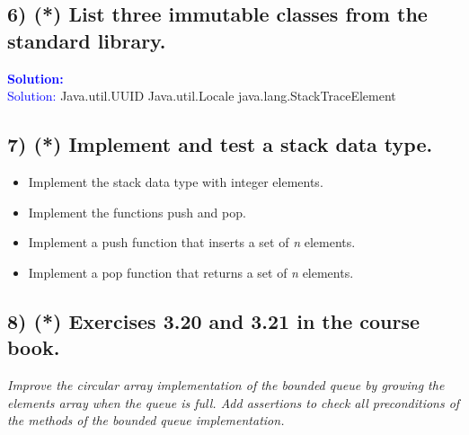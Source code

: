 \documentclass{article}
\begin{document}
\subsection*{6) (*) List three immutable classes from the standard library.}
\indent \textbf{\textcolor{blue}{Solution:}} \\
\textcolor{blue}{Solution:}
Java.util.UUID
Java.util.Locale
java.lang.StackTraceElement

\subsection*{7) (*) Implement and test a stack data type.}
\begin{itemize}
    \item Implement the stack data type with integer elements.
    \item Implement the functions push and pop.
    \item Implement a push function that inserts a set of \textit{n} elements.
    \item Implement a pop function that returns a set of \textit{n} elements.
\end{itemize}
\subsection*{8) (*) Exercises 3.20 and 3.21 in the course book.}
\textit{Improve the circular array implementation of the
bounded queue by growing the elements array when the queue is full. Add assertions to check
all preconditions of the methods of the bounded queue implementation.}\\



\end{document}
